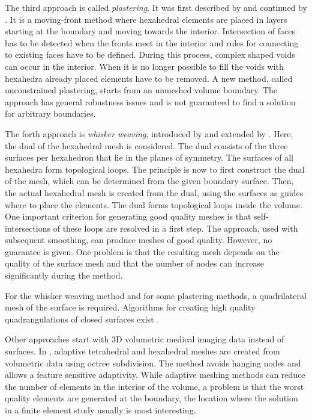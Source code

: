 The third approach is called \emph{plastering}. It was first described by \cite{blacker1993seams} and continued by \cite{staten2006unconstrained,staten2010unconstrained}.
It is a moving-front method where hexahedral elements are placed in layers starting at the boundary and moving towards the interior. Intersection of faces has to be detected when the fronts meet in the interior and rules for connecting to existing faces have to be defined.
During this process, complex shaped voids can occur in the interior. When it is no longer possible to fill the voids with hexahedra already placed elements have to be removed.
A new method, called unconstrained plastering, starts from an unmeshed volume boundary. The approach has general robustness issues and is not guaranteed to find a solution for arbitrary boundaries.

The forth approach is \emph{whisker weaving}, introduced by \cite{tautges1996whisker} and extended by \cite{ledoux2008extension,kawamura2008strategy}. Here, the dual of the hexahedral mesh is considered. The dual consists of the three surfaces per hexahedron that lie in the planes of symmetry. The surfaces of all hexahedra form topological loops. 
The principle is now to first construct the dual of the mesh, which can be determined from the given boundary surface. Then, the actual hexahedral mesh is created from the dual, using the surfaces as guides where to place the elements.
The dual forms topological loops inside the volume. One important criterion for generating good quality meshes is that self-intersections of these loops are resolved in a first step.
The approach, used with subsequent smoothing, can produce meshes of good quality. However, no guarantee is given. One problem is that the resulting mesh depends on the quality of the surface mesh and that the number of nodes can increase significantly during the method.

For the whisker weaving method and for some plastering methods, a quadrilateral mesh of the surface is required. Algorithms for creating high quality quadrangulations of closed surfaces exist \cite{dong2005quadrangulating,Kovacs2011Anisotropic,Bessmeltsev2012,Meng2016Consistent}.

Other approaches start with 3D volumetric medical imaging data instead of surfaces. In \cite{Zhang2003,Zhang20053DFiniteElementMeshing}, adaptive tetrahedral and hexahedral meshes are created from volumetric data using octree subdivision. The method avoids hanging nodes and allows a feature sensitive adaptivity. While adaptive meshing methods can reduce the number of elements in the interior of the volume, a problem is that the worst quality elements are generated at the boundary, the location where the solution in a finite element study usually is most interesting.

